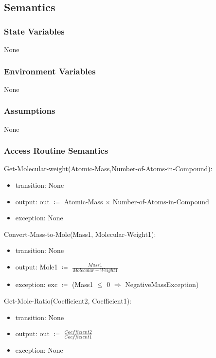 \documentclass[12pt, titlepage]{article}
\begin{document}
\subsection{Semantics}

\subsubsection{State Variables}

None


\subsubsection{Environment Variables}

None

\subsubsection{Assumptions}

None

\subsubsection{Access Routine Semantics}

\noindent Get-Molecular-weight(Atomic-Mass,Number-of-Atoms-in-Compound):
\begin{itemize}
\item transition: None
\item output: out $\coloneqq$  Atomic-Mass $\times$ Number-of-Atoms-in-Compound
\item exception: None 
\end{itemize}

\noindent Convert-Mass-to-Mole(Mass1, Molecular-Weight1):
\begin{itemize}
\item transition: None
\item output: Mole1 $\coloneqq$  $\frac{Mass1}{Molecular-Weight1}$
\item exception: exc $\coloneqq$ (Mass1 $\leq$ 0 $\Rightarrow$ NegativeMassException) 
\end{itemize}

\noindent Get-Mole-Ratio(Coefficient2, Coefficient1):
\begin{itemize}
\item transition: None
\item output: out $\coloneqq$ $\frac{Coefficient2}{Coefficient1}$
\item exception: None 
\end{itemize}
\end{document}
